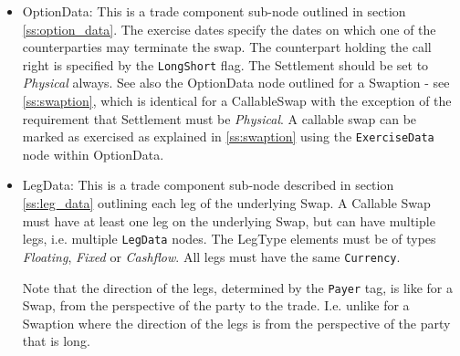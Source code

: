 \begin{itemize}

\item OptionData: This is a trade component sub-node outlined in section \ref{ss:option_data}. The exercise dates
  specify the dates on which one of the counterparties may terminate the swap. The counterpart holding the call right is
  specified by the {\tt LongShort} flag. The Settlement should be set to \emph{Physical} always. See also the OptionData
  node outlined for a Swaption - see \ref{ss:swaption}, which is identical for a CallableSwap with the exception of the
  requirement that Settlement must be \emph{Physical}. A callable swap can be marked as exercised as explained in
  \ref{ss:swaption} using the \lstinline!ExerciseData! node within OptionData.

\item LegData: This is a trade component sub-node described in section \ref{ss:leg_data} outlining each leg of the
  underlying Swap. A Callable Swap must have at least one leg on the underlying Swap, but can have multiple legs,
  i.e. multiple \lstinline!LegData! nodes.  The LegType elements must be of types \emph{Floating}, \emph{Fixed} or
  \emph{Cashflow}. All legs must have the same \lstinline!Currency!.
  
  Note that the direction of the legs, determined by the \lstinline!Payer! tag, is like for a Swap, from the perspective of the party to the trade. I.e. unlike for a Swaption where the direction of the legs is from the perspective of the party that is long. 

\end{itemize}
